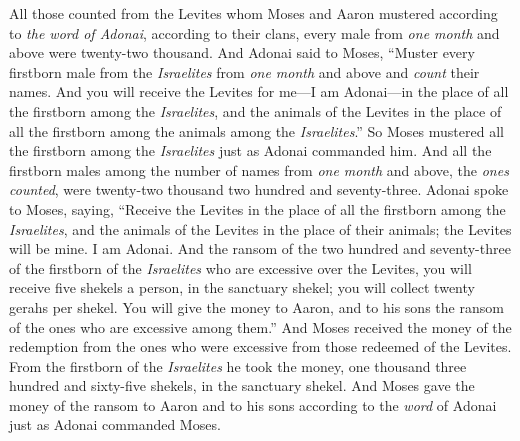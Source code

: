 \begin{biblechapter}
\verse All those counted from the Levites whom Moses and Aaron mustered according to \textit{the word of Adonai}, according to their clans, every male from \textit{one month} and above were twenty-two thousand.
\verse And Adonai said to Moses, “Muster every firstborn male from the \textit{Israelites} from \textit{one month} and above and \textit{count} their names.
\verse And you will receive the Levites for me—I am Adonai—in the place of all the firstborn among the \textit{Israelites}, and the animals of the Levites in the place of all the firstborn among the animals among the \textit{Israelites}.”
\verse So Moses mustered all the firstborn among the \textit{Israelites} just as Adonai commanded him.
\verse And all the firstborn males among the number of names from \textit{one month} and above, the \textit{ones counted}, were twenty-two thousand two hundred and seventy-three.
\verse Adonai spoke to Moses, saying,
\verse “Receive the Levites in the place of all the firstborn among the \textit{Israelites}, and the animals of the Levites in the place of their animals; the Levites will be mine. I am Adonai.
\verse And the ransom of the two hundred and seventy-three of the firstborn of the \textit{Israelites} who are excessive over the Levites,
\verse you will receive five shekels a person, in the sanctuary shekel; you will collect twenty gerahs per shekel.
\verse You will give the money to Aaron, and to his sons the ransom of the ones who are excessive among them.”
\verse And Moses received the money of the redemption from the ones who were excessive from those redeemed of the Levites.
\verse From the firstborn of the \textit{Israelites} he took the money, one thousand three hundred and sixty-five shekels, in the sanctuary shekel.
\verse And Moses gave the money of the ransom to Aaron and to his sons according to the \textit{word} of Adonai just as Adonai commanded Moses.
\end{biblechapter}

